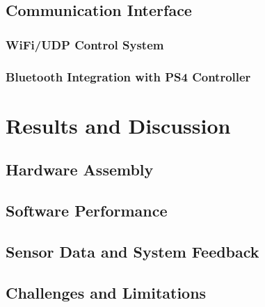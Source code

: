 \documentclass[a4paper, 12pt,titlepage,openany]{report}
\begin{document}
	\section{Communication Interface}
	
	\subsection{WiFi/UDP Control System}
	
	\subsection{Bluetooth Integration with PS4 Controller}
	
	\chapter{Results and Discussion}
	
	\section{Hardware Assembly}
	
	\section{Software Performance}
	
	\section{Sensor Data and System Feedback}
	
	\section{Challenges and Limitations}
	
\end{document}
